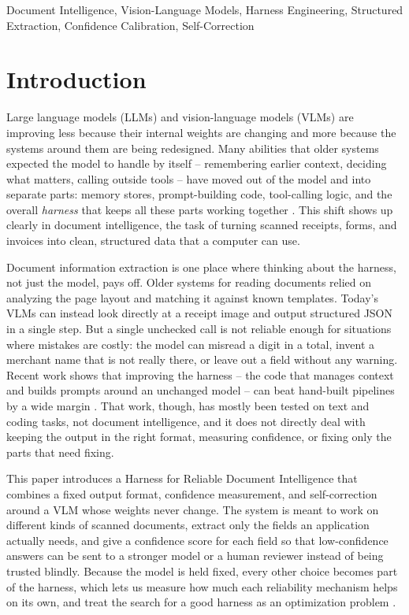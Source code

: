 \documentclass[conference]{IEEEtran}
\begin{document}
\begin{IEEEkeywords}
Document Intelligence, Vision-Language Models, Harness Engineering, Structured Extraction, Confidence Calibration, Self-Correction
\end{IEEEkeywords}

\section{Introduction}

Large language models (LLMs) and vision-language models (VLMs) are improving less because their internal weights are changing and more because the systems around them are being redesigned. Many abilities that older systems expected the model to handle by itself -- remembering earlier context, deciding what matters, calling outside tools -- have moved out of the model and into separate parts: memory stores, prompt-building code, tool-calling logic, and the overall \emph{harness} that keeps all these parts working together \cite{b1}. This shift shows up clearly in document intelligence, the task of turning scanned receipts, forms, and invoices into clean, structured data that a computer can use.

Document information extraction is one place where thinking about the harness, not just the model, pays off. Older systems for reading documents relied on analyzing the page layout and matching it against known templates. Today's VLMs can instead look directly at a receipt image and output structured JSON in a single step. But a single unchecked call is not reliable enough for situations where mistakes are costly: the model can misread a digit in a total, invent a merchant name that is not really there, or leave out a field without any warning. Recent work shows that improving the harness -- the code that manages context and builds prompts around an unchanged model -- can beat hand-built pipelines by a wide margin \cite{b2}. That work, though, has mostly been tested on text and coding tasks, not document intelligence, and it does not directly deal with keeping the output in the right format, measuring confidence, or fixing only the parts that need fixing.

This paper introduces a Harness for Reliable Document Intelligence that combines a fixed output format, confidence measurement, and self-correction around a VLM whose weights never change. The system is meant to work on different kinds of scanned documents, extract only the fields an application actually needs, and give a confidence score for each field so that low-confidence answers can be sent to a stronger model or a human reviewer instead of being trusted blindly. Because the model is held fixed, every other choice becomes part of the harness, which lets us measure how much each reliability mechanism helps on its own, and treat the search for a good harness as an optimization problem \cite{b2}.
\end{document}
